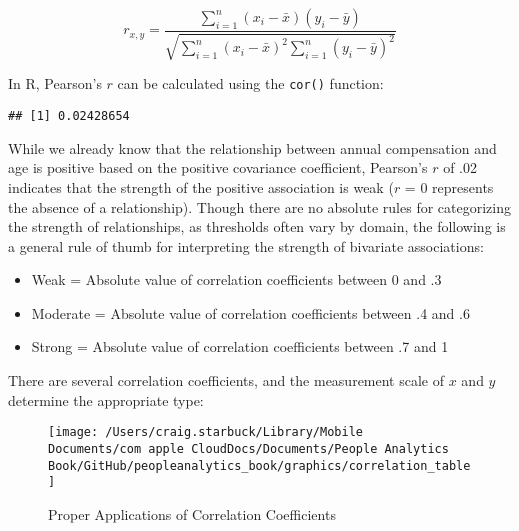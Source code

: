 \documentclass[
]{book}
\newenvironment{Shaded}{\begin{snugshade}}{\end{snugshade}}
\newcommand{\AttributeTok}[1]{\textcolor[rgb]{0.77,0.63,0.00}{#1}}
\newcommand{\CommentTok}[1]{\textcolor[rgb]{0.56,0.35,0.01}{\textit{#1}}}
\newcommand{\FunctionTok}[1]{\textcolor[rgb]{0.00,0.00,0.00}{#1}}
\newcommand{\NormalTok}[1]{#1}
\newcommand{\SpecialCharTok}[1]{\textcolor[rgb]{0.00,0.00,0.00}{#1}}
\newcommand{\StringTok}[1]{\textcolor[rgb]{0.31,0.60,0.02}{#1}}
\providecommand{\tightlist}{%
  \setlength{\itemsep}{0pt}\setlength{\parskip}{0pt}}
\begin{document}
\[ r_{x,y} = \frac{\displaystyle\sum_{i=1}^{n} (x_{i}-\bar{x})(y_{i}-\bar{y})}{\sqrt{\displaystyle\sum_{i=1}^{n} (x_{i}-\bar{x})^2 \displaystyle\sum_{i=1}^{n} (y_{i}-\bar{y})^2}} \]

In R, Pearson's \(r\) can be calculated using the \texttt{cor()} function:

\begin{Shaded}
\end{Shaded}

\begin{verbatim}
## [1] 0.02428654
\end{verbatim}

While we already know that the relationship between annual compensation and age is positive based on the positive covariance coefficient, Pearson's \(r\) of .02 indicates that the strength of the positive association is weak (\(r\) = 0 represents the absence of a relationship). Though there are no absolute rules for categorizing the strength of relationships, as thresholds often vary by domain, the following is a general rule of thumb for interpreting the strength of bivariate associations:

\begin{itemize}
\tightlist
\item
  Weak = Absolute value of correlation coefficients between 0 and .3
\item
  Moderate = Absolute value of correlation coefficients between .4 and .6
\item
  Strong = Absolute value of correlation coefficients between .7 and 1
\end{itemize}

There are several correlation coefficients, and the measurement scale of \(x\) and \(y\) determine the appropriate type:

\begin{figure}

{\centering \texttt{[image: /Users/craig.starbuck/Library/Mobile Documents/com~apple~CloudDocs/Documents/People Analytics Book/GitHub/peopleanalytics\_book/graphics/correlation\_table]} 

}

\caption{Proper Applications of Correlation Coefficients}\label{fig:corr-table}
\end{figure}
\end{document}
